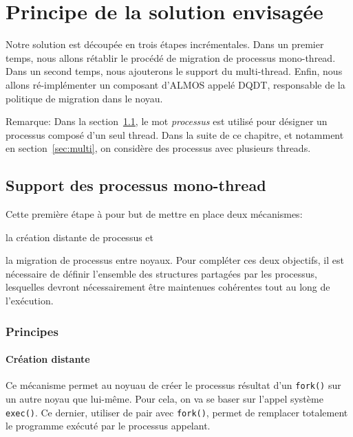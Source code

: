 \chapter{Principe de la solution envisagée}
\label{chap:sol}

  Notre solution est découpée en trois étapes incrémentales. Dans un premier
  temps, nous allons rétablir le procédé de migration de processus
  mono-thread. Dans un second temps, nous ajouterons le support du
  multi-thread. Enfin, nous allons ré-implémenter un composant d'ALMOS appelé
  DQDT, responsable de la politique de migration dans le noyau.

  \begin{paragraph}{Remarque:}
    Dans la section~\ref{sec:mono}, le mot \textit{processus} est utilisé pour
    désigner un processus composé d'un seul thread. Dans la suite de ce
    chapitre, et notamment en section~\ref{sec:multi}, on considère des
    processus avec plusieurs threads.
  \end{paragraph}


  \section{Support des processus mono-thread}
  \label{sec:mono}

    Cette première étape à pour but de mettre en place deux mécanismes:
    \benumline \item la création distante de processus et \item la migration de
    processus entre noyaux\eenumline. Pour compléter ces deux objectifs, il est
    nécessaire de définir l'ensemble des structures partagées par les processus,
    lesquelles devront nécessairement être maintenues cohérentes tout au long de
    l'exécution.

    \subsection{Principes}

      \subsubsection{Création distante}
        Ce mécanisme permet au noyuau de créer le processus résultat d'un
        \texttt{fork()} sur un autre noyau que lui-même. Pour cela, on va se
        baser sur l'appel système \texttt{exec()}. Ce dernier, utiliser de pair
        avec \texttt{fork()}, permet de remplacer totalement le programme
        exécuté par le processus appelant.


